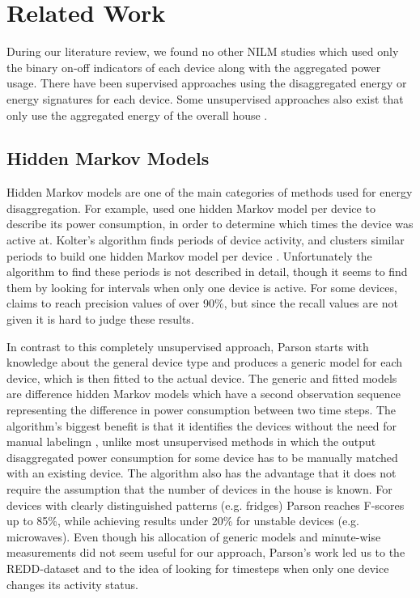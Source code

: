 \documentclass{article}
\begin{document}
\section{Related Work}


During our literature review, we found no other NILM studies which used only the binary on-off indicators of each device along with the aggregated power usage.
There have been supervised approaches using the disaggregated energy\cite{Kelly} or energy signatures \cite{Parson} for each device.
Some unsupervised approaches also exist that only use the aggregated energy of the overall house \cite{Kolter}.

\subsection{Hidden Markov Models}

Hidden Markov models are one of the main categories of methods used for energy disaggregation.
For example, \cite{Kolter} used one hidden Markov model per device to describe its power consumption, in order to determine which times the device was active at.
Kolter's algorithm finds periods of device activity, and clusters similar periods to build one hidden Markov model per device \cite{Kolter}.
Unfortunately the algorithm to find these periods is not described in detail, though it seems to find them by looking for intervals when only one device is active.
For some devices, \cite{Kolter} claims to reach precision values of over 90\%, but since the recall values are not given it is hard to judge these results.

In contrast to this completely unsupervised approach, Parson \cite{Parson} starts with knowledge about the general device type and produces a generic model for each device, which is then fitted to the actual device.
The generic and fitted models are difference hidden Markov models \cite{Kolter} which have a second observation sequence representing the difference in power consumption between two time steps.
The algorithm's biggest benefit is that it identifies the devices without the need for manual labelingn \cite{Parson}, unlike most unsupervised methods in which the output disaggregated power consumption for some device has to be manually matched with an existing device.
The algorithm also has the advantage that it does not require the assumption that the number of devices in the house is known.
For devices with clearly distinguished patterns (e.g. fridges) Parson reaches F-scores up to 85\%, while achieving results under 20\% for unstable devices (e.g. microwaves).
Even though his allocation of generic models and minute-wise measurements did not seem useful for our approach, Parson's work led us to the REDD-dataset and to the idea of looking for timesteps when only one device changes its activity status.
\end{document}
